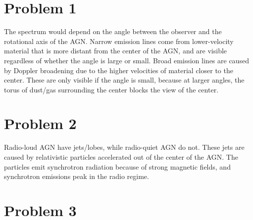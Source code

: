 \documentclass[11pt,letterpaper]{article}
\begin{document}
\section*{Problem 1}

The spectrum would depend on the angle between the observer and the rotational axis of the AGN. Narrow emission lines come from lower-velocity material that is more distant from the center of the AGN, and are visible regardless of whether the angle is large or small. Broad emission lines are caused by Doppler broadening due to the higher velocities of material closer to the center. These are only visible if the angle is small, because at larger angles, the torus of dust/gas surrounding the center blocks the view of the center. 

\section*{Problem 2}

Radio-loud AGN have jets/lobes, while radio-quiet AGN do not. These jets are caused by relativistic particles accelerated out of the center of the AGN. The particles emit synchrotron radiation because of strong magnetic fields, and synchrotron emissions peak in the radio regime. 

\section*{Problem 3}
\end{document}
